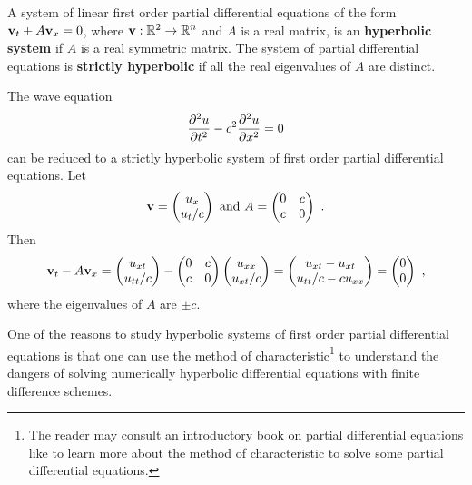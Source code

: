 \begin{defn}
A system of linear first order partial differential equations of the
form $\displaystyle   \mathbf{v}_t + A \mathbf{v}_x = 0$,
where $\mathbf{v}: \mathbb{R}^2 \rightarrow \mathbb{R}^n$ and $A$ is a \nn real matrix,
is an {\bfseries hyperbolic system} if $A$ is a \nn real symmetric
matrix\footnotemark.  The system of partial
differential equations is
{\bfseries strictly hyperbolic} if all the real eigenvalues of
$A$ are distinct.
\end{defn}


The wave equation
\[
\frac{\partial^{2}{u}}{\partial{t}^{2}} - c^2 \frac{\partial^{2}{u}}{\partial{x}^{2}} = 0
\]
can be reduced to a strictly hyperbolic system of first order partial
differential equations.  Let
\[
\VEC{v} =
\begin{pmatrix}
u_x \\ u_t/c
\end{pmatrix}
\ \text{and} \ 
A = \begin{pmatrix}
0 & c \\
c & 0
\end{pmatrix} \ .
\]
Then
\[
\mathbf{v}_t - A \mathbf{v}_x
=
\begin{pmatrix}
 u_{xt} \\ u_{tt}/c
\end{pmatrix}
-
\begin{pmatrix}
0 & c \\
c & 0
\end{pmatrix}
\begin{pmatrix}
u_{xx} \\ u_{xt}/c
\end{pmatrix}
=
\begin{pmatrix}
 u_{xt} - u_{xt} \\
u_{tt}/c - c u_{xx}
\end{pmatrix}
=
\begin{pmatrix}
 0 \\ 0
\end{pmatrix} \ ,
\]
where the eigenvalues of $A$ are $\pm c$.

One of the reasons to study hyperbolic systems of first order partial
differential equations is that one can use the method of
characteristic\footnote{The reader may consult an introductory book on
partial differential equations like \cite{Str} to learn more about the
method of characteristic to solve some partial differential
equations.} to understand the dangers of solving numerically
hyperbolic differential equations with finite difference schemes.

